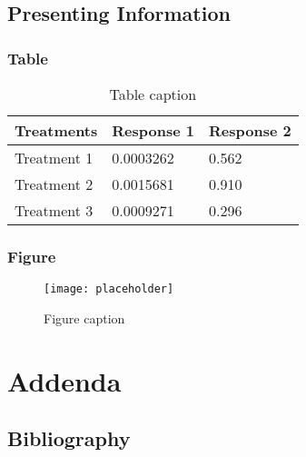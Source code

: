 \documentclass[11pt,fleqn,,a4paper,twoside,openright]{book} %
\begin{document}


\chapter{Presenting Information}

\section{Table}

\begin{table}[h]
\centering
\begin{tabular}{l l l}
\toprule
\textbf{Treatments} & \textbf{Response 1} & \textbf{Response 2}\\
\midrule
Treatment 1 & 0.0003262 & 0.562 \\
Treatment 2 & 0.0015681 & 0.910 \\
Treatment 3 & 0.0009271 & 0.296 \\
\bottomrule
\end{tabular}
\caption{Table caption}
\end{table}


\section{Figure}

\begin{figure}[h]
\centering\texttt{[image: placeholder]}
\caption{Figure caption}
\end{figure}

\part{Addenda}
\chapter*{Bibliography}
\end{document}
